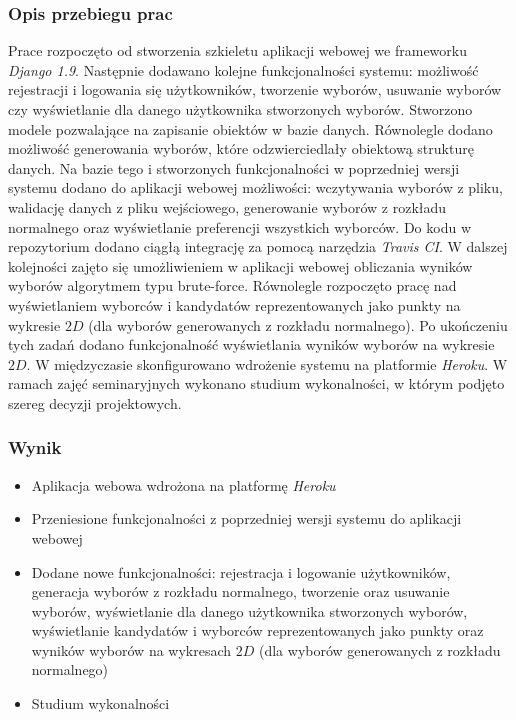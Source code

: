 \documentclass[pdflatex,11pt]{../aghdoc_version2}
\begin{document}
\subsubsection{Opis przebiegu prac}
Prace rozpoczęto od stworzenia szkieletu aplikacji webowej we frameworku \textit{Django 1.9}. 
Następnie dodawano kolejne funkcjonalności systemu: możliwość rejestracji i
logowania się użytkowników, tworzenie wyborów, usuwanie wyborów czy wyświetlanie dla
danego użytkownika stworzonych wyborów. Stworzono modele pozwalające na zapisanie
obiektów w bazie danych. Równolegle dodano możliwość generowania wyborów, które
odzwierciedlały obiektową strukturę danych. Na bazie tego i stworzonych funkcjonalności w
poprzedniej wersji systemu dodano do aplikacji webowej możliwości: wczytywania wyborów
z pliku, walidację danych z pliku wejściowego, generowanie wyborów z rozkładu normalnego
oraz wyświetlanie preferencji wszystkich wyborców. Do kodu w repozytorium dodano ciągłą
integrację za pomocą narzędzia \textit{Travis CI}. W dalszej kolejności zajęto się umożliwieniem w aplikacji webowej obliczania wyników wyborów algorytmem typu brute-force. Równolegle
rozpoczęto pracę nad wyświetlaniem wyborców i kandydatów reprezentowanych jako punkty
na wykresie $2D$ (dla wyborów generowanych z rozkładu normalnego). Po ukończeniu tych
zadań dodano funkcjonalność wyświetlania wyników wyborów na wykresie $2D$. W
międzyczasie skonfigurowano wdrożenie systemu na platformie \textit{Heroku}. W ramach zajęć
seminaryjnych wykonano studium wykonalności, w którym podjęto szereg decyzji
projektowych.
\subsubsection{Wynik}
\begin{itemize}
\item Aplikacja webowa wdrożona na platformę \textit{Heroku}
\item Przeniesione funkcjonalności z poprzedniej wersji systemu do aplikacji webowej
\item Dodane nowe funkcjonalności: rejestracja i logowanie użytkowników, generacja
wyborów z rozkładu normalnego, tworzenie oraz usuwanie wyborów, wyświetlanie
dla danego użytkownika stworzonych wyborów, wyświetlanie kandydatów i wyborców
reprezentowanych jako punkty oraz wyników wyborów na wykresach $2D$ (dla
wyborów generowanych z rozkładu normalnego)
\item Studium wykonalności
\end{itemize}
\end{document}
